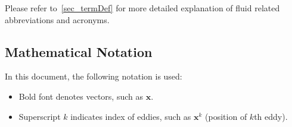 \documentclass[12pt]{article}
\begin{document}
Please refer to~\ref{sec_termDef} for more detailed explanation of fluid related abbreviations and acronyms.

\subsection{Mathematical Notation}
In this document, the following notation is used:
\begin{itemize}
  \item Bold font denotes vectors, such as $\mathbf{x}$.
  \item Superscript $k$ indicates index of eddies, such as $\mathbf{x}^k$ (position of $k$th eddy).
\end{itemize}



\newpage




\end{document}
